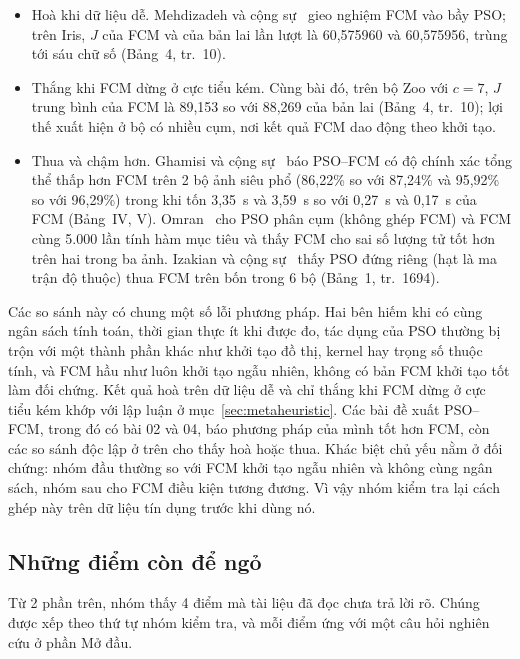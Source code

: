 \begin{itemize}
  \item Hoà khi dữ liệu dễ. Mehdizadeh và cộng sự~\cite{mehdizadeh2008hybrid} gieo nghiệm FCM vào bầy PSO; trên Iris, $J$ của
  FCM và của bản lai lần lượt là 60,575960 và 60,575956, trùng tới sáu chữ số (Bảng~4, tr.~10).
  \item Thắng khi FCM dừng ở cực tiểu kém. Cùng bài đó, trên bộ Zoo với $c = 7$, $J$ trung bình của FCM là 89,153 so với
  88,269 của bản lai (Bảng~4, tr.~10); lợi thế xuất hiện ở bộ có nhiều cụm, nơi kết quả FCM dao động theo khởi tạo.
  \item Thua và chậm hơn. Ghamisi và cộng sự~\cite{ghamisi2015swarm} báo PSO--FCM có độ chính xác tổng thể thấp hơn FCM
  trên 2 bộ ảnh siêu phổ (86,22\% so với 87,24\% và 95,92\% so với 96,29\%) trong khi tốn 3,35~s và 3,59~s so với 0,27~s
  và 0,17~s của FCM (Bảng~IV, V). Omran~\cite{omran2004thesis} cho PSO phân cụm (không ghép FCM) và FCM cùng 5.000 lần tính
  hàm mục tiêu và thấy FCM cho sai số lượng tử tốt hơn trên hai trong ba ảnh. Izakian và cộng sự~\cite{izakian2009hybrid}
  thấy PSO đứng riêng (hạt là ma trận độ thuộc) thua FCM trên bốn trong 6 bộ (Bảng~1, tr.~1694).
\end{itemize}

Các so sánh này có chung một số lỗi phương pháp. Hai bên hiếm khi có cùng ngân sách tính toán, thời gian thực ít khi được đo,
tác dụng của PSO thường bị trộn với một thành phần khác như khởi tạo đồ thị, kernel hay trọng số thuộc tính, và FCM hầu như
luôn khởi tạo ngẫu nhiên, không có bản FCM khởi tạo tốt làm đối chứng. Kết quả hoà trên dữ liệu dễ và chỉ thắng khi FCM
dừng ở cực tiểu kém khớp với lập luận ở mục~\ref{sec:metaheuristic}. Các bài đề xuất PSO--FCM, trong đó có bài 02 và 04,
báo phương pháp của mình tốt hơn FCM, còn các so sánh độc lập ở trên cho thấy hoà hoặc thua. Khác biệt chủ yếu nằm ở đối
chứng: nhóm đầu thường so với FCM khởi tạo ngẫu nhiên và không cùng ngân sách, nhóm sau cho FCM điều kiện tương đương. Vì
vậy nhóm kiểm tra lại cách ghép này trên dữ liệu tín dụng trước khi dùng nó.

\subsection{Những điểm còn để ngỏ}
\label{sec:diem-de-ngo}

Từ 2 phần trên, nhóm thấy 4 điểm mà tài liệu đã đọc chưa trả lời rõ. Chúng được xếp theo thứ tự nhóm kiểm tra, và mỗi
điểm ứng với một câu hỏi nghiên cứu ở phần Mở đầu.

